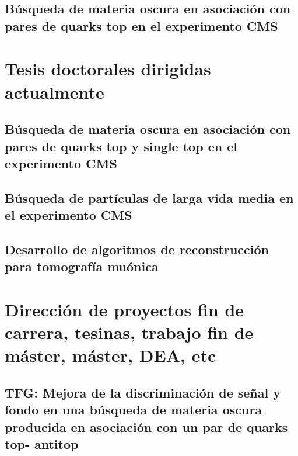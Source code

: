 \documentclass[a4paper, 11pt, twoside, openright]{report}
\begin{document}
\subsection{Búsqueda de materia oscura en asociación con pares de quarks top en el experimento CMS}


\section{Tesis doctorales dirigidas actualmente}

\subsection{Búsqueda de materia oscura en asociación con pares de quarks top y single top en el experimento CMS}


\subsection{Búsqueda de partículas de larga vida media en el experimento CMS}


\subsection{Desarrollo de algoritmos de reconstrucción para tomografía muónica}



\section{Dirección de proyectos fin de carrera, tesinas, trabajo fin de máster, máster, DEA, etc}

\subsection{TFG: Mejora de la discriminación de señal y fondo en una búsqueda de materia oscura producida en asociación con un par de quarks top- antitop}

\end{document}
